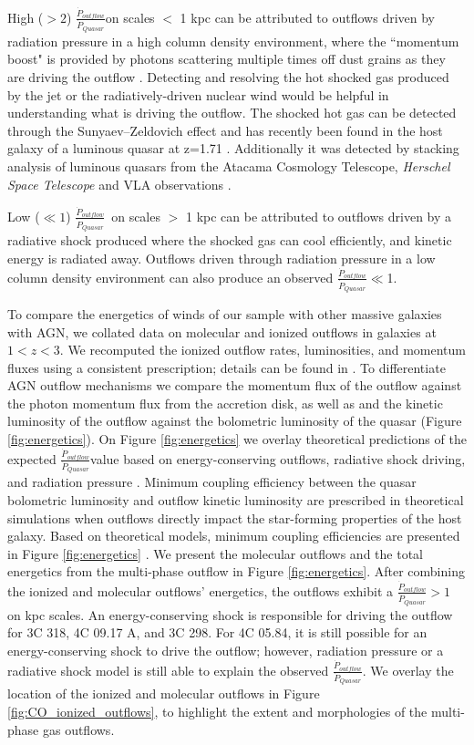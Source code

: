 \documentclass[twocolumn]{aastex63}
\newcommand{\momfluxratio}{$\frac{\dot{P}_{outflow}}{\dot{P}_{Quasar}}$}
\begin{document}
High ($>2$) \momfluxratio on scales $<$ 1 kpc can be attributed to outflows driven by radiation pressure in a high column density environment, where the ``momentum boost" is provided by photons scattering multiple times off dust grains as they are driving the outflow \citep{Thompson15}. Detecting and resolving the hot shocked gas produced by the jet or the radiatively-driven nuclear wind would be helpful in understanding what is driving the outflow. The shocked hot gas can be detected through the Sunyaev–Zeldovich effect \citep{Chatterjee07} and has recently been found in the host galaxy of a luminous quasar at z=1.71 \citep{Lacy19}. Additionally it was detected by stacking analysis of luminous quasars from the Atacama Cosmology Telescope, \textit{Herschel Space Telescope} and VLA observations \citep{Hall19}.

Low ($\ll1$) \momfluxratio\ on scales $>$ 1 kpc can be attributed to outflows driven by a radiative shock produced where the shocked gas can cool efficiently, and kinetic energy is radiated away. Outflows driven through radiation pressure in a low column density environment can also produce an observed \momfluxratio $\ll$1. 

To compare the energetics of winds of our sample with other massive galaxies with AGN, we collated data on molecular and ionized outflows in galaxies at $1<z<3$. We recomputed the ionized outflow rates, luminosities, and momentum fluxes using a consistent prescription; details can be found in \citet{Vayner19a}. To differentiate AGN outflow mechanisms we compare the momentum flux of the outflow against the photon momentum flux from the accretion disk, as well as and the kinetic luminosity of the outflow against the bolometric luminosity of the quasar (Figure \ref{fig:energetics}). On Figure \ref{fig:energetics} we overlay theoretical predictions of the expected \momfluxratio value based on energy-conserving outflows, radiative shock driving, and radiation pressure \citep{Faucher12,Zubovas12,Zubovas14}. Minimum coupling efficiency between the quasar bolometric luminosity and outflow kinetic luminosity are prescribed in theoretical simulations when outflows directly impact the star-forming properties of the host galaxy. Based on theoretical models, minimum coupling efficiencies are presented in Figure \ref{fig:energetics} \citep{Hopkins10,Choi12,Costa18}. We present the molecular outflows and the total energetics from the multi-phase outflow in Figure \ref{fig:energetics}. After combining the ionized and molecular outflows' energetics, the outflows exhibit a \momfluxratio $>1$ on kpc scales. An energy-conserving shock is responsible for driving the outflow for 3C 318, 4C 09.17 A, and 3C 298. For 4C 05.84, it is still possible for an energy-conserving shock to drive the outflow; however, radiation pressure or a radiative shock model is still able to explain the observed \momfluxratio. We overlay the location of the ionized and molecular outflows in Figure \ref{fig:CO_ionized_outflows}, to highlight the extent and morphologies of the multi-phase gas outflows.
\end{document}
